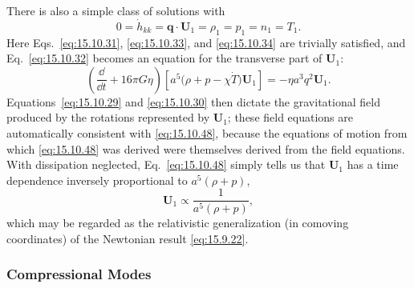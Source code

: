There is also a simple class of solutions with
\begin{equation}
  0
  =
  \dot h_{kk}
  =
  \mathbf q\cdot\mathbf U_1
  =
  \rho_1
  =
  p_1
  =
  n_1
  =
  T_1.
  \tag{15.10.47}\label{eq:15.10.47}
\end{equation}
Here Eqs.~\eqref{eq:15.10.31}, \eqref{eq:15.10.33}, and
\eqref{eq:15.10.34} are trivially satisfied, and
Eq.~\eqref{eq:15.10.32} becomes an equation for the transverse part of
\(\mathbf U_1\):
\begin{equation}
  \left(\frac{\dd}{\dd t}+16\pi G\eta\right)
  \left[
    a^5\bigl(\rho+p-\chi\dot T\bigr)\mathbf U_1
  \right]
  =
  -\eta a^3q^2\mathbf U_1.
  \tag{15.10.48}\label{eq:15.10.48}
\end{equation}
Equations~\eqref{eq:15.10.29} and \eqref{eq:15.10.30} then dictate the
gravitational field produced by the rotations represented by
\(\mathbf U_1\); these field equations are automatically consistent with
\eqref{eq:15.10.48}, because the equations of motion from which
\eqref{eq:15.10.48} was derived were themselves derived from the field
equations. With dissipation neglected, Eq.~\eqref{eq:15.10.48} simply
tells us that \(\mathbf U_1\) has a time dependence inversely proportional
to \(a^5(\rho+p)\),
\begin{equation}
  \mathbf U_1\propto\frac1{a^5(\rho+p)},
  \tag{15.10.49}\label{eq:15.10.49}
\end{equation}
which may be regarded as the relativistic generalization (in comoving
coordinates) of the Newtonian result \eqref{eq:15.9.22}.

\subsubsection*{Compressional Modes}

